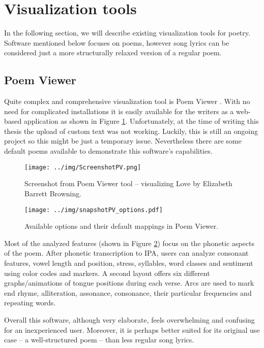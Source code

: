 \section{Visualization tools}
In the following section, we will describe existing visualization tools for poetry. Software mentioned below focuses on poems, however song lyrics can be considered just a more structurally relaxed version of a regular poem.


\subsection*{Poem Viewer}
Quite complex and comprehensive visualization tool is Poem Viewer \citep{Abdul2013}. With no need for complicated installations it is easily available for the writers as a web-based application as shown in Figure \ref{screenshotPV}. Unfortunately, at the time of writing this thesis the upload of custom text was not working. Luckily, this is still an ongoing project so this might be just a temporary issue. Nevertheless there are some default poems available to demonstrate this software's capabilities.
\begin{figure}[h]\centering
	\texttt{[image: ../img/ScreenshotPV.png]}
	\caption{Screenshot from Poem Viewer tool -- visualizing Love by Elizabeth Barrett Browning.}\label{screenshotPV}
\end{figure}

\begin{figure}[h]\centering
	\texttt{[image: ../img/snapshotPV\_options.pdf]}
	\caption{Available options and their default mappings in Poem Viewer.}\label{screenshotPV-options}
\end{figure}

Most of the analyzed features (shown in Figure \ref{screenshotPV-options}) focus on the phonetic aspects of the poem. After phonetic transcription to IPA, users can analyze consonant features, vowel length and position, stress, syllables, word classes and sentiment using color codes and markers. A second layout offers six different graphs/animations of tongue positions during each verse. Arcs are used to mark end rhyme, alliteration, assonance, consonance, their particular frequencies and repeating words.


Overall this software, although very elaborate, feels overwhelming and confusing for an inexperienced user. Moreover, it is perhaps better suited for its original use case -- a well-structured poem -- than less regular song lyrics.


